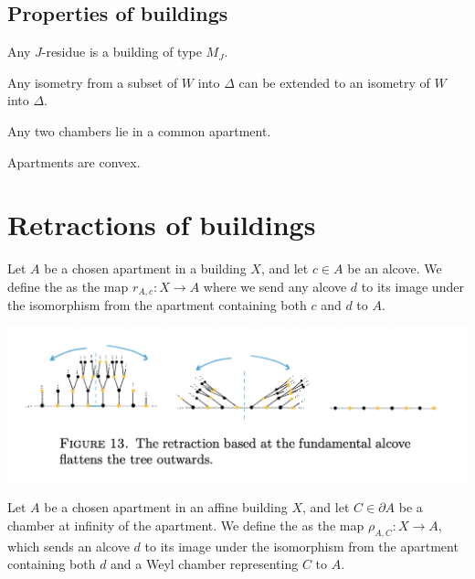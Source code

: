\documentclass[11pt]{article}
\begin{document}
\subsection{Properties of buildings}
\begin{theorem}
    Any $J$-residue is a building of type $M_J$. 
\end{theorem}

\begin{theorem}
    Any isometry from a subset of $W$ into $\Delta$ can be extended to an isometry of $W$ into $\Delta$.
\end{theorem}

\begin{corollary}
    Any two chambers lie in a common apartment.
\end{corollary}

\begin{theorem}
    Apartments are convex.
\end{theorem}

\section{Retractions of buildings}

\begin{definition}
    Let $A$ be a chosen apartment in a building $X$, and let $c\in A$ be an alcove. We define the  as the map $r_{A,c}:X\longrightarrow A$ where we send any alcove $d$ to its image under the isomorphism from the apartment containing both $c$ and $d$ to $A$. 
\end{definition}

\includegraphics[scale=0.7]{Screenshot 2023-02-15 at 13.32.45.png}\\

\begin{definition}
    Let $A$ be a chosen apartment in an affine building $X$, and let $C\in \partial A$ be a chamber at infinity of the apartment. We define the  as the map $\rho_{A,C}:X\longrightarrow A$, which sends an alcove $d$ to its image under the isomorphism from the apartment containing both $d$ and a Weyl chamber representing $C$ to $A$. 
\end{definition}
\end{document}
